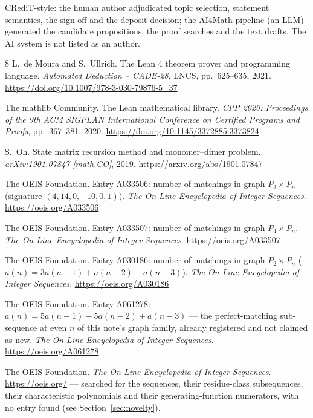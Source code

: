 \documentclass[11pt]{article}
\theoremstyle{definition}
\begin{document}
CRediT-style: the human author adjudicated topic selection, statement
semantics, the sign-off and the deposit decision; the AI4Math pipeline (an
LLM) generated the candidate propositions, the proof searches and the text
drafts. The AI system is not listed as an author.

\begin{thebibliography}{8}
L.~de Moura and S.~Ullrich.
\newblock The Lean 4 theorem prover and programming language.
\newblock \emph{Automated Deduction -- CADE-28}, LNCS, pp.~625--635, 2021.
\url{https://doi.org/10.1007/978-3-030-79876-5_37}

The mathlib Community.
\newblock The Lean mathematical library.
\newblock \emph{CPP 2020: Proceedings of the 9th ACM SIGPLAN International
Conference on Certified Programs and Proofs}, pp.~367--381, 2020.
\url{https://doi.org/10.1145/3372885.3373824}

S.~Oh.
\newblock State matrix recursion method and monomer--dimer problem.
\newblock \emph{arXiv:1901.07847 [math.CO]}, 2019.
\url{https://arxiv.org/abs/1901.07847}

The OEIS Foundation.
\newblock Entry A033506: number of matchings in graph $P_3 \times P_n$
(signature $(4,14,0,-10,0,1)$).
\newblock \emph{The On-Line Encyclopedia of Integer Sequences}.
\url{https://oeis.org/A033506}

The OEIS Foundation.
\newblock Entry A033507: number of matchings in graph $P_4 \times P_n$.
\newblock \emph{The On-Line Encyclopedia of Integer Sequences}.
\url{https://oeis.org/A033507}

The OEIS Foundation.
\newblock Entry A030186: number of matchings in graph $P_2 \times P_n$
($a(n)=3a(n-1)+a(n-2)-a(n-3)$).
\newblock \emph{The On-Line Encyclopedia of Integer Sequences}.
\url{https://oeis.org/A030186}

The OEIS Foundation.
\newblock Entry A061278: $a(n)=5a(n-1)-5a(n-2)+a(n-3)$ --- the
perfect-matching sub-sequence at even $n$ of this note's graph family,
already registered and not claimed as new.
\newblock \emph{The On-Line Encyclopedia of Integer Sequences}.
\url{https://oeis.org/A061278}

The OEIS Foundation.
\newblock \emph{The On-Line Encyclopedia of Integer Sequences}.
\newblock \url{https://oeis.org/} --- searched for the sequences, their
residue-class subsequences, their characteristic polynomials and their
generating-function numerators, with no entry found (see
Section~\ref{sec:novelty}).
\end{thebibliography}
\end{document}
